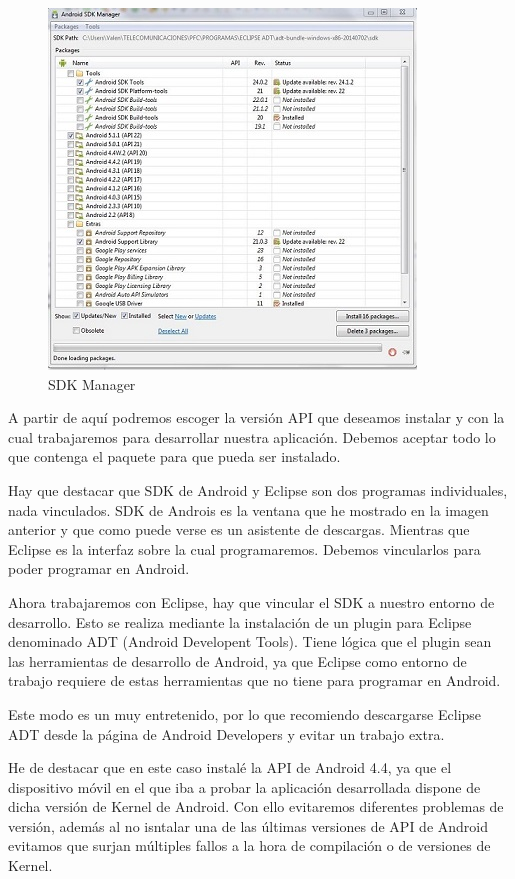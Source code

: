 		\begin{figure}[h]
			\centering
			\includegraphics{imagenes/SDK.jpg}
			\caption{SDK Manager}
			\label{contexto:figura}
		\end{figure}
		
		A partir de aquí podremos escoger la versión API que deseamos instalar y con la cual trabajaremos para desarrollar nuestra aplicación. Debemos aceptar todo lo que contenga el paquete para que pueda ser instalado.
		
		Hay que destacar que SDK de Android y Eclipse son dos programas individuales, nada vinculados. SDK de Androis es la ventana que he mostrado en la imagen anterior y que como puede verse es un asistente de descargas. Mientras que Eclipse es la interfaz sobre la cual programaremos. Debemos vincularlos para poder programar en Android.
		
		Ahora trabajaremos con Eclipse, hay que vincular el SDK a nuestro entorno de desarrollo. Esto se realiza mediante la instalación de un plugin para Eclipse denominado ADT (Android Developent Tools). Tiene lógica que el plugin sean las herramientas de desarrollo de Android, ya que Eclipse como entorno de trabajo requiere de estas herramientas que no tiene para programar en Android.
		
		Este modo es un muy entretenido, por lo que recomiendo descargarse Eclipse ADT desde la página de Android Developers y evitar un trabajo extra.
		
		He de destacar que en este caso instalé la API de Android 4.4, ya que el dispositivo móvil en el que iba a probar la aplicación desarrollada dispone de dicha versión de Kernel de Android. Con ello evitaremos diferentes problemas de versión, además al no isntalar una de las últimas versiones de API de Android evitamos que surjan múltiples fallos a la hora de compilación o de versiones de Kernel.
		
		
	\newpage
	$\ $